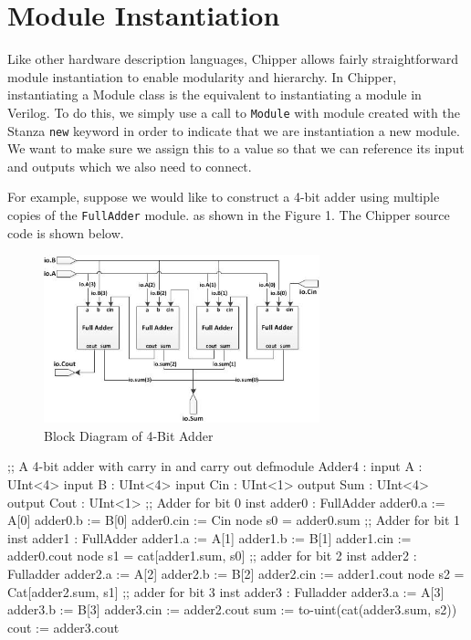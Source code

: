 \section{Module Instantiation}

Like other hardware description languages, Chipper allows fairly straightforward module instantiation to enable modularity and hierarchy. In Chipper, instantiating a Module class is the equivalent to instantiating a module in Verilog. To do this, we simply use a call to \verb+Module+ with module created with the Stanza \verb+new+ keyword in order to indicate that we are instantiation a new module. We want to make sure we assign this to a value so that we can reference its input and outputs which we also need to connect.

For example, suppose we would like to construct a 4-bit adder using multiple copies of the  \verb+FullAdder+ module. as shown in the Figure 1. The Chipper source code is shown below.

\begin{figure}[ht!]
\centering
\includegraphics[width=80mm]{figs/4_Bit_Adder.jpg}
\caption{Block Diagram of 4-Bit Adder}
\label{overflow}
\end{figure}

\begin{stanza}
;; A 4-bit adder with carry in and carry out
defmodule Adder4 :
  input A     : UInt<4>
  input B     : UInt<4>
  input Cin   : UInt<1>
  output Sum  : UInt<4>
  output Cout : UInt<1>
  ;; Adder for bit 0
  inst adder0 : FullAdder
  adder0.a   := A[0]
  adder0.b   := B[0]
  adder0.cin := Cin
  node s0 = adder0.sum
  ;; Adder for bit 1
  inst adder1 : FullAdder
  adder1.a   := A[1]
  adder1.b   := B[1]
  adder1.cin := adder0.cout
  node s1 = cat[adder1.sum, s0]
  ;; adder for bit 2
  inst adder2 : Fulladder
  adder2.a   := A[2]
  adder2.b   := B[2]
  adder2.cin := adder1.cout
  node s2 = Cat[adder2.sum, s1]
  ;; adder for bit 3
  inst adder3 : Fulladder
  adder3.a   := A[3]
  adder3.b   := B[3]
  adder3.cin := adder2.cout
  sum  := to-uint(cat(adder3.sum, s2))
  cout := adder3.cout
\end{stanza}

